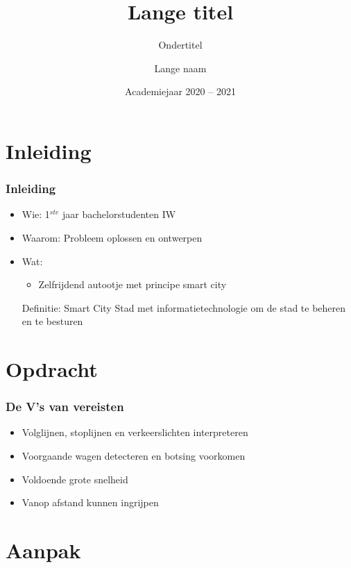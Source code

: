 \documentclass
   [kulak] %
   {kulakbeamer}
\title[Korte titel]{Lange titel}
\subtitle{Ondertitel}
\author[Korte naam]{Lange naam}
\institute[Kulak]{KU Leuven Kulak}
\date{Academiejaar 2020 -- 2021}
\begin{document}
\begin{titleframe}
\titlepage
\end{titleframe}

\begin{outlineframe}[Overzicht]
\tableofcontents
\end{outlineframe}


\section{Inleiding}

\begin{frame}
\frametitle{Inleiding}
\begin{itemize}
	\item Wie: 1$^{ste}$ jaar bachelorstudenten IW 
	\item Waarom: Probleem oplossen en ontwerpen
	\item Wat:
	\begin{itemize}
		\item Zelfrijdend autootje met principe smart city
	\end{itemize}
	\begin{block}{Definitie: Smart City}
		Stad met informatietechnologie om de stad te beheren en te besturen \cite{SmartCity}
	\end{block}
\end{itemize}
\end{frame}


\section[Opdracht]{Opdracht}%

\begin{frame}
\frametitle{De V's van vereisten}
\begin{itemize}
	\item Volglijnen, stoplijnen en verkeerslichten interpreteren
	\item Voorgaande wagen detecteren en botsing voorkomen
	\item Voldoende grote snelheid
	\item Vanop afstand kunnen ingrijpen
\end{itemize}

\end{frame}



\section{Aanpak}
\end{document}
